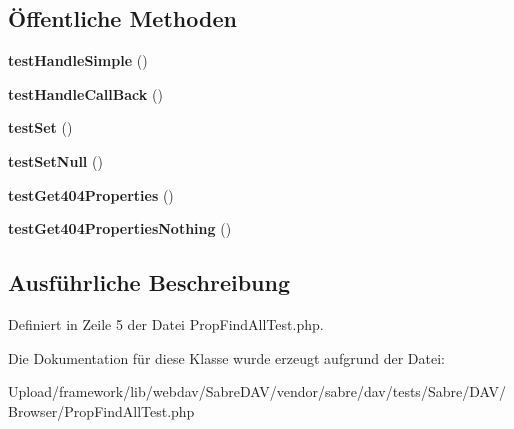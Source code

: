 \subsection*{Öffentliche Methoden}
\begin{DoxyCompactItemize}
\item 
\mbox{\label{class_sabre_1_1_d_a_v_1_1_browser_1_1_prop_find_all_test_a6e71ed9df2d65b35e924ba9536a9807c}} 
{\bfseries test\+Handle\+Simple} ()
\item 
\mbox{\label{class_sabre_1_1_d_a_v_1_1_browser_1_1_prop_find_all_test_aaf812decfa5e1c6727be49b31b451191}} 
{\bfseries test\+Handle\+Call\+Back} ()
\item 
\mbox{\label{class_sabre_1_1_d_a_v_1_1_browser_1_1_prop_find_all_test_abff3c29fc12283beb2e37f424a2e2668}} 
{\bfseries test\+Set} ()
\item 
\mbox{\label{class_sabre_1_1_d_a_v_1_1_browser_1_1_prop_find_all_test_aa27d0046fe2acad4279eb6ae87556a92}} 
{\bfseries test\+Set\+Null} ()
\item 
\mbox{\label{class_sabre_1_1_d_a_v_1_1_browser_1_1_prop_find_all_test_a699933754897a8cea8b86851ec24bcc4}} 
{\bfseries test\+Get404\+Properties} ()
\item 
\mbox{\label{class_sabre_1_1_d_a_v_1_1_browser_1_1_prop_find_all_test_a5d41a53d162156ae4181852800546582}} 
{\bfseries test\+Get404\+Properties\+Nothing} ()
\end{DoxyCompactItemize}


\subsection{Ausführliche Beschreibung}


Definiert in Zeile 5 der Datei Prop\+Find\+All\+Test.\+php.



Die Dokumentation für diese Klasse wurde erzeugt aufgrund der Datei\+:\begin{DoxyCompactItemize}
\item 
Upload/framework/lib/webdav/\+Sabre\+D\+A\+V/vendor/sabre/dav/tests/\+Sabre/\+D\+A\+V/\+Browser/Prop\+Find\+All\+Test.\+php\end{DoxyCompactItemize}

